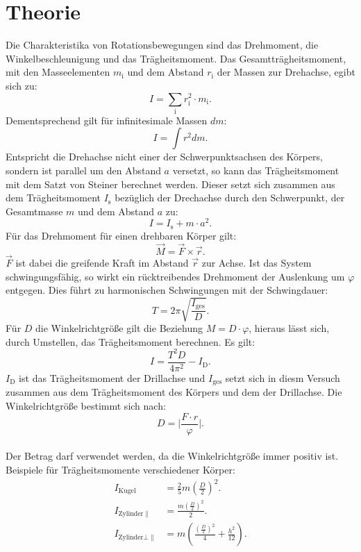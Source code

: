 \section{Theorie}
\label{sec:Theorie}

Die Charakteristika von Rotationsbewegungen sind das Drehmoment,
die Winkelbeschleunigung und das Trägheitsmoment.
Das Gesamtträgheitsmoment, mit den Masseelementen $m_{\mathrm{i}}$ und dem Abstand $r_{\mathrm{i}}$
der Massen zur Drehachse, egibt sich zu:
\begin{equation}
  I=\sum_{\mathrm{i}} r_{\mathrm{i}}^2\cdot m_{\mathrm{i}}.
\end{equation}
Dementsprechend gilt für infinitesimale Massen $dm$:
\begin{equation}
  I=\int r^2dm.
\end{equation}
Entspricht die Drehachse nicht einer der Schwerpunktsachsen des Körpers, sondern
ist parallel um den Abstand $a$ versetzt, so kann das Trägheitsmoment mit dem Satzt
von Steiner berechnet werden. Dieser setzt sich zusammen aus dem Trägheitsmoment $I_{\mathrm{s}}$
bezüglich der Drechachse durch den Schwerpunkt, der Gesamtmasse $m$ und dem Abstand $a$
zu:
\begin{equation}
  I=I_{\mathrm{s}}+m\cdot a^2.
\end{equation}
Für das Drehmoment für einen drehbaren Körper gilt:
\begin{equation}
 \vec{M}=\vec{F}\times\vec{r}.
\end{equation}
$\vec{F}$ ist dabei die greifende Kraft im Abstand $\vec{r}$ zur Achse.
Ist das System schwingungsfähig, so wirkt ein rücktreibendes Drehmoment
der Auslenkung um $\varphi$ entgegen. Dies führt zu harmonischen Schwingungen
mit der Schwingdauer:
\begin{equation}
  T=2\pi\sqrt{\frac{I_{\mathrm{{ges}}}}{D}}.
\end{equation}
Für $D$ die Winkelrichtgröße gilt die Beziehung $M=D\cdot\varphi$, hieraus lässt
sich, durch Umstellen, das Trägheitsmoment berechnen.
Es gilt:
\begin{equation}
 I=\frac{T^2 D}{4\pi^2}-I_{\mathrm{D}}.\label{eqn:I}
\end{equation}
$I_{\mathrm{D}}$ ist das Trägheitsmoment der Drillachse und $I_{\mathrm{ges}}$ setzt sich in diesm Versuch zusammen aus dem Trägheitsmoment des Körpers und dem der Drillachse.
Die Winkelrichtgröße bestimmt sich nach:
\begin{equation}
  D=\bigl|\frac{F\cdot r}{\varphi}\bigr|. \label{eqn:D}
\end{equation}\\
Der Betrag darf verwendet werden, da die Winkelrichtgröße immer positiv ist.
Beispiele für Trägheitsmomente verschiedener Körper:
\begin{align}
  I_{\mathrm{Kugel}}&=\frac{2}{5} m (\frac{D}{2})^2.\label{eqn:Kugel}\\
  I_{\mathrm{Zylinder\parallel}}&=\frac{m(\frac{D}{2})^2}{2}\label{eqn:zs}.\\
  I_{\mathrm{Zylinder\bot\parallel}}&=m\left(\frac{(\frac{D}{2})^2}{4}+\frac{h^2}{12}\right).\label{eqn:zl}
\end{align}

